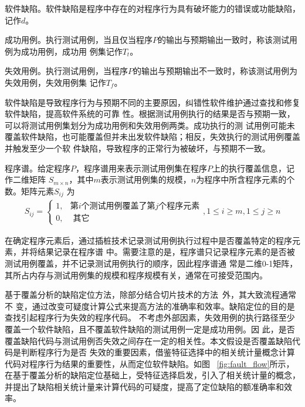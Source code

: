 \begin{Definition}
      软件缺陷。软件缺陷是程序中存在的对程序行为具有破坏能力的错误或功能缺陷，记作$d$。
\end{Definition}

\begin{Definition}
      成功用例。执行测试用例，当且仅当程序$P$的输出与预期输出一致时，称该测试用例为成功用例，成功用
      例集记作$T_t$。
\end{Definition}

\begin{Definition}
      失效用例。执行测试用例，当程序$P$的输出与预期输出不一致时，称该测试用例为失效用例，失效用例集
      记作$T_f$。
\end{Definition}

软件缺陷是导致程序行为与预期不同的主要原因，纠错性软件维护通过查找和修复软件缺陷，提高软件系统的可靠
性。根据测试用例执行的结果是否与预期一致，可以将测试用例集划分为成功用例和失效用例两类。成功执行的测
试用例可能未覆盖软件缺陷，也可能覆盖但并未出发软件缺陷；相反，失效执行的测试用例覆盖并触发至少一个软
件缺陷，导致程序的正常行为被破坏，与预期不一致。

\begin{Definition}
      程序谱。给定程序$P$，程序谱用来表示测试用例集在程序$P$上的执行覆盖信息，记作二维矩阵
      $S_{m\times n}$，其中$m$表示测试用例集的规模，$n$为程序中所含程序元素的个数。矩阵元素$S_{ij}$
      为
      \begin{eqnarray}
         S_{ij} = \begin{cases} 1, & \mbox{第}i\mbox{个测试用例覆盖了第}j\mbox{个程序元素} \\ 
  0, & \text{ 其它 }  
  \end{cases}   , 1 \leqslant i \geqslant  m, 1 \leqslant j \geqslant n
      \end{eqnarray}
\end{Definition}

在确定程序元素后，通过插桩技术记录测试用例执行过程中是否覆盖特定的程序元素，并将结果记录在程序谱
中。需要注意的是，程序谱只记录程序元素的是否被测试用例覆盖，并不记录测试用例执行的顺序，因此程序谱通
常是二维0-1矩阵，其所占内存与测试用例集的规模和程序规模有关，通常在可接受范围内。

基于覆盖分析的缺陷定位方法，除部分结合切片技术的方法~\cite{conslice2013,wen2013}外，其大致流程通常不
变，通过改变可疑度计算公式来提高方法的准确率和效率。缺陷定位的目的是查找引起程序行为失效的程序代码。
不考虑外部因素，失效用例的执行路径至少覆盖一个软件缺陷，且不覆盖软件缺陷的测试用例一定是成功用例。因
此，是否覆盖缺陷代码与测试用例否失效之间存在一定的相关性。本文假设是否覆盖缺陷代码是判断程序行为是否
失效的重要因素，借鉴特征选择中的相关统计量概念计算代码对程序行为结果的重要性，从而定位软件缺陷。如图
~\ref{fig:fault_flow}所示，在基于覆盖分析的缺陷定位基础上，受特征选择启发，引入了相关统计量的概念，
并提出了缺陷相关统计量来计算代码的可疑度，提高了定位缺陷的额准确率和效率。


